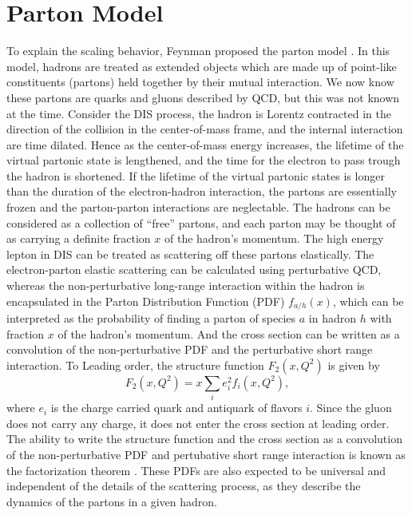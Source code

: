 \documentclass[../main.tex]{subfiles}
\begin{document}
\section{Parton Model}
\label{sec:parton}
To explain the scaling behavior, Feynman proposed the parton model \cite{feynman1969}.
In this model, hadrons are treated as extended objects which are made up of point-like
constituents (partons) held together by their mutual interaction. We now know
these partons are quarks and gluons described by QCD, but this was not known at
the time. Consider the DIS process, the hadron is Lorentz contracted in the
direction of the collision in the center-of-mass frame, and the internal
interaction are time dilated. Hence as the center-of-mass energy increases, the
lifetime of the virtual partonic state is lengthened, and the time for the
electron to pass trough the hadron is shortened. If the lifetime of the virtual
partonic states is longer than the duration of the electron-hadron interaction,
the partons are essentially frozen and the parton-parton interactions are
neglectable. The hadrons can be considered as a collection of ``free'' partons,
and each parton may be thought of as carrying a definite fraction $x$ of the
hadron's momentum. The high energy lepton in DIS can be treated as scattering
off these partons elastically. The electron-parton elastic scattering can be
calculated using perturbative QCD, whereas the non-perturbative long-range
interaction within the hadron is encapsulated in the Parton Distribution
Function (PDF) $f_{a/h}\left(x\right)$, which can be interpreted as the probability
of finding a parton of species $a$ in hadron $h$ with fraction $x$ of the hadron's momentum.
And the cross section can be written as a convolution
of the non-perturbative PDF and the perturbative short range interaction. To Leading
order, the structure function $F_2\left(x,Q^2\right)$ is given by
\begin{equation}
	F_2\left(x,Q^2\right)=x\sum_i e^2_i f_i\left(x,Q^2\right),
	\label{eq:F2_parton}
\end{equation}
where $e_i$ is the charge carried quark and antiquark of flavors $i$. Since the
gluon does not carry any charge, it does not enter the cross section at leading
order. The ability to write the structure function and the cross section as a
convolution of the non-perturbative PDF and pertubative short range interaction
is known as the factorization theorem \cite{collins1989}. These PDFs are also
expected to be universal and independent of the details of the scattering
process, as they describe the dynamics of the partons in a given hadron.
\end{document}

